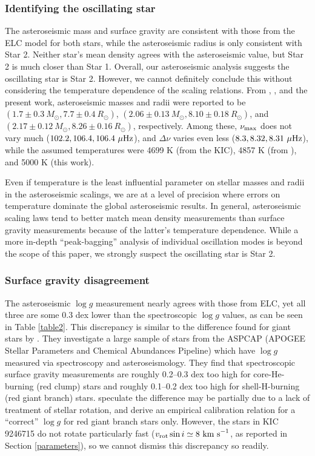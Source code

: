 \subsubsection{Identifying the oscillating star}
The asteroseismic mass and surface gravity are consistent with those from the ELC model for both stars, while the asteroseismic radius is only consistent with Star 2. Neither star's mean density agrees with the asteroseismic value, but Star 2 is much closer than Star 1. Overall, our asteroseismic analysis suggests the oscillating star is Star 2. However, we cannot definitely conclude this without considering the temperature dependence of the scaling relations. From \citet{gau13}, \citet{gau14}, and the present work, asteroseismic masses and radii were reported to be $(1.7 \pm 0.3 \ M_\odot, 7.7 \pm 0.4 \ R_\odot)$, $(2.06 \pm 0.13 \ M_\odot, 8.10 \pm 0.18 \ R_\odot)$, and $(2.17 \pm 0.12 \ M_\odot, 8.26 \pm 0.16 \ R_\odot)$, respectively. Among these, $\nu_{\rm{max}}$ does not vary much ($102.2, 106.4, 106.4 \ \mu\rm{Hz}$), and $\Delta \nu$ varies even less ($8.3, 8.32, 8.31 \ \mu\rm{Hz}$), while the assumed temperatures were 4699 K (from the KIC), 4857 K (from \citealt{hub14.2}), and 5000 K (this work).

Even if temperature is the least influential parameter on stellar masses and radii in the asteroseismic scalings, we are at a level of precision where errors on temperature dominate the global asteroseismic results. In general, asteroseismic scaling laws tend to better match mean density measurements than surface gravity measurements because of the latter's temperature dependence. While a more in-depth ``peak-bagging'' analysis of individual oscillation modes is beyond the scope of this paper, we strongly suspect the oscillating star is Star 2.

\subsubsection{Surface gravity disagreement}
The asteroseismic $\log g$ measurement nearly agrees with those from ELC, yet all three are some 0.3 dex lower than the spectroscopic $\log g$ values, as can be seen in Table \ref{table2}. This discrepancy is similar to the difference found for giant stars by \citet{hol15}. They investigate a large sample of stars from the ASPCAP (APOGEE Stellar Parameters and Chemical Abundances Pipeline) which have $\log g$ measured via spectroscopy and asteroseismology. They find that spectroscopic surface gravity measurements are roughly 0.2--0.3 dex too high for core-He-burning (red clump) stars and roughly 0.1--0.2 dex too high for shell-H-burning (red giant branch) stars. \citet{hol15} speculate the difference may be partially due to a lack of treatment of stellar rotation, and derive an empirical calibration relation for a ``correct'' $\log g$ for red giant branch stars only. However, the stars in KIC 9246715 do not rotate particularly fast ($v_{\rm{rot}} \sin i \simeq 8 \ \rm{km \ s}^{-1}$, as reported in Section \ref{parameters}), so we cannot dismiss this discrepancy so readily.

  
  
  